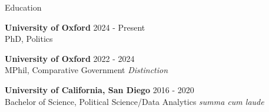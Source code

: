 \documentclass[10pt]{resume} %
\begin{document}
	


	
	\begin{rSection}{Education}
		
		{\bf University of Oxford} \hfill {2024 - Present} 
		\\ PhD, Politics
		
		{\bf University of Oxford} \hfill {2022 - 2024} 
		\\ MPhil, Comparative Government \hfill {\em Distinction}
		
		{\bf University of California, San Diego} \hfill {2016 - 2020} 
		\\ Bachelor of Science, Political Science/Data Analytics \hfill {\em summa cum laude}
		
	\end{rSection}
	
	
\end{document}
